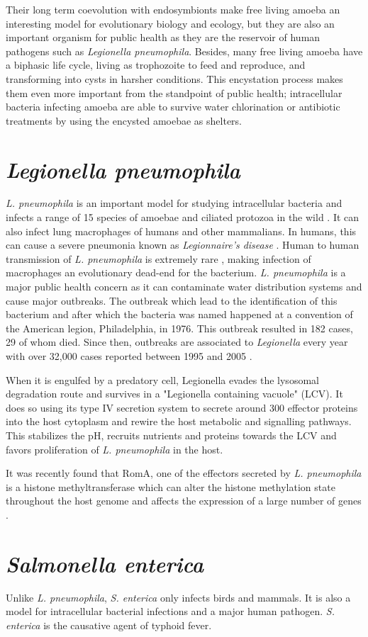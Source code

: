 Their long term coevolution with endosymbionts make free living amoeba an interesting model for evolutionary biology and ecology, but they are also an important organism for public health as they are the reservoir of human pathogens such as \textit{Legionella pneumophila}. Besides, many free living amoeba have a biphasic life cycle, living as trophozoite to feed and reproduce, and transforming into cysts in harsher conditions. This encystation process makes them even more important from the standpoint of public health; intracellular bacteria infecting amoeba are able to survive water chlorination or antibiotic treatments by using the encysted amoebae as shelters.

\section{\textit{Legionella pneumophila}}

\textit{L. pneumophila} is an important model for studying intracellular bacteria and infects a range of 15 species of amoebae and ciliated protozoa in the wild \cite{Rowbotham1980}. It can also infect lung macrophages of humans and other mammalians. In humans, this can cause a severe pneumonia known as \textit{Legionnaire's disease} \cite{CentersforDiseaseControlandPrevention2018}. Human to human transmission of \textit{L. pneumophila} is extremely rare \cite{Correia2016}, making infection of macrophages an evolutionary dead-end for the bacterium. \textit{L. pneumophila} is a major public health concern as it can contaminate water distribution systems and cause major outbreaks. The outbreak which lead to the identification of this bacterium and after which the bacteria was named happened at a convention of the American legion, Philadelphia, in 1976. This outbreak resulted in 182 cases, 29 of whom died. Since then, outbreaks are associated to \textit{Legionella} every year with over 32,000 cases reported between 1995 and 2005 \cite{who2020}.

When it is engulfed by a predatory cell, Legionella evades the lysosomal degradation route and survives in a "Legionella containing vacuole" (LCV). It does so using its type IV secretion system to secrete around 300 effector proteins into the host cytoplasm and rewire the host metabolic and signalling pathways. This stabilizes the pH, recruits nutrients and proteins towards the LCV and favors proliferation of \textit{L. pneumophila} in the host.

It was recently found that RomA, one of the effectors secreted by \textit{L. pneumophila} is a histone methyltransferase which can alter the histone methylation state throughout the host genome and affects the expression of a large number of genes \cite{Rolando2013}.
\section{\textit{Salmonella enterica}}

Unlike \textit{L. pneumophila}, \textit{S. enterica} only infects birds and mammals. It is also a model for intracellular bacterial infections and a major human pathogen. \textit{S. enterica} is the causative agent of typhoid fever.

